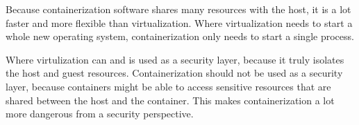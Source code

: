 Because containerization software shares many resources with the host, it is a lot faster and more flexible than virtualization. Where virtualization needs to start a whole new operating system, containerization only needs to start a single process.

\hfill

Where virtulization can and is used as a security layer, because it truly isolates the host and guest resources. Containerization should not be used as a security layer, because containers might be able to access sensitive resources that are shared between the host and the container. This makes containerization a lot more dangerous from a security perspective.
